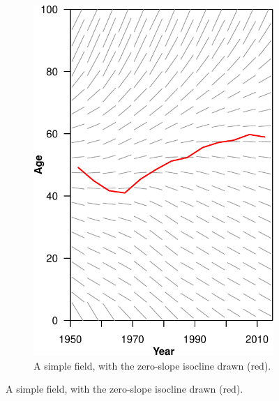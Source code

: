 \documentclass{article}
\begin{document}
\begin{figure}
\begin{subfigure}{.5\textwidth}
  \includegraphics[scale=.6]{Figures/Fig10-crop.pdf}
  \caption{A simple field, with the zero-slope isocline drawn (red).}
  \label{fig:sfig2}
\end{subfigure}


\end{figure}
\end{document}
